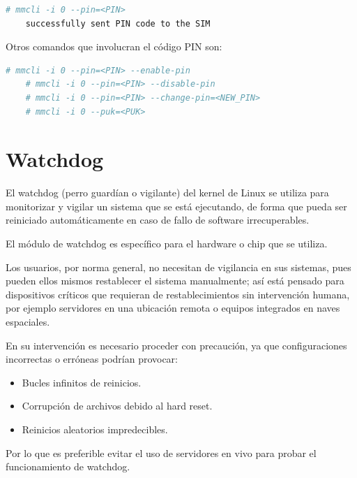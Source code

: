 \documentclass[a4paper, 11pt, titlepage]{book}
\begin{document}
            \begin{lstlisting}[language=bash,basicstyle=\footnotesize]
    # mmcli -i 0 --pin=<PIN>
    successfully sent PIN code to the SIM\end{lstlisting}

            Otros comandos que involucran el código PIN son:

            \begin{lstlisting}[language=bash,basicstyle=\footnotesize]
    # mmcli -i 0 --pin=<PIN> --enable-pin
    # mmcli -i 0 --pin=<PIN> --disable-pin
    # mmcli -i 0 --pin=<PIN> --change-pin=<NEW_PIN>
    # mmcli -i 0 --puk=<PUK>\end{lstlisting}
            

    \section{Watchdog}

    El watchdog (perro guardían o vigilante) del kernel de Linux se utiliza para 
    monitorizar y vigilar un sistema que se está ejecutando, de forma que pueda 
    ser reiniciado automáticamente en caso de fallo de software irrecuperables.

    El módulo de watchdog es específico para el hardware o chip que se utiliza.

    Los usuarios, por norma general, no necesitan de vigilancia en sus sistemas, 
    pues pueden ellos mismos restablecer el sistema manualmente; así está pensado
    para dispositivos críticos que requieran de restablecimientos sin intervención
    humana, por ejemplo servidores en una ubicación remota o equipos integrados 
    en naves espaciales.

    En su intervención es necesario proceder con precaución, ya que configuraciones
    incorrectas o erróneas podrían provocar:

    \begin{itemize}
        \item Bucles infinitos de reinicios.
        \item Corrupción de archivos debido al hard reset.
        \item Reinicios aleatorios impredecibles.
    \end{itemize}

    Por lo que es preferible evitar el uso de servidores en vivo para probar el 
    funcionamiento de watchdog.
\end{document}
